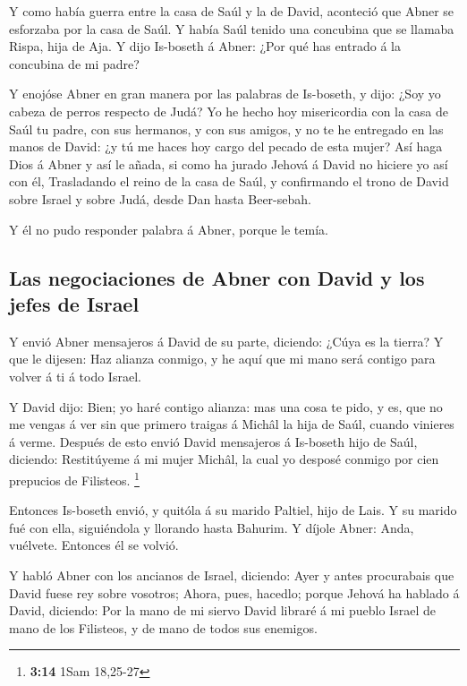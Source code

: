  Y como había guerra entre la casa de Saúl y la de David,
aconteció que Abner se esforzaba por la casa de Saúl.  Y
había Saúl tenido una concubina que se llamaba Rispa, hija de Aja. Y
dijo Is-boseth á Abner: ¿Por qué has entrado á la concubina de mi padre?

 Y enojóse Abner en gran manera por las palabras de
Is-boseth, y dijo: ¿Soy yo cabeza de perros respecto de Judá? Yo he
hecho hoy misericordia con la casa de Saúl tu padre, con sus hermanos, y
con sus amigos, y no te he entregado en las manos de David: ¿y tú me
haces hoy cargo del pecado de esta mujer?  Así haga Dios á
Abner y así le añada, si como ha jurado Jehová á David no hiciere yo así
con él,  Trasladando el reino de la casa de Saúl, y
confirmando el trono de David sobre Israel y sobre Judá, desde Dan hasta
Beer-sebah.

 Y él no pudo responder palabra á Abner, porque le temía.

\hypertarget{las-negociaciones-de-abner-con-david-y-los-jefes-de-israel}{%
\subsection{Las negociaciones de Abner con David y los jefes de
Israel}\label{las-negociaciones-de-abner-con-david-y-los-jefes-de-israel}}

 Y envió Abner mensajeros á David de su parte, diciendo:
¿Cúya es la tierra? Y que le dijesen: Haz alianza conmigo, y he aquí que
mi mano será contigo para volver á ti á todo Israel.

 Y David dijo: Bien; yo haré contigo alianza: mas una
cosa te pido, y es, que no me vengas á ver sin que primero traigas á
Michâl la hija de Saúl, cuando vinieres á verme.  Después
de esto envió David mensajeros á Is-boseth hijo de Saúl, diciendo:
Restitúyeme á mi mujer Michâl, la cual yo desposé conmigo por cien
prepucios de Filisteos. \footnote{\textbf{3:14} 1Sam 18,25-27}

 Entonces Is-boseth envió, y quitóla á su marido Paltiel,
hijo de Lais.  Y su marido fué con ella, siguiéndola y
llorando hasta Bahurim. Y díjole Abner: Anda, vuélvete. Entonces él se
volvió.

 Y habló Abner con los ancianos de Israel, diciendo: Ayer
y antes procurabais que David fuese rey sobre vosotros; 
Ahora, pues, hacedlo; porque Jehová ha hablado á David, diciendo: Por la
mano de mi siervo David libraré á mi pueblo Israel de mano de los
Filisteos, y de mano de todos sus enemigos.

